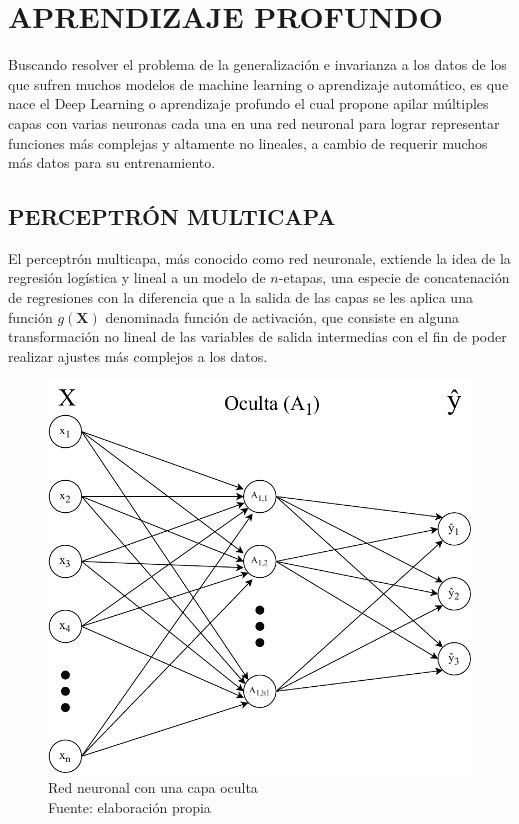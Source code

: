 \section{APRENDIZAJE PROFUNDO}
    Buscando resolver el problema de la generalización e invarianza a los datos de los que sufren muchos modelos de machine learning o aprendizaje automático, es que nace el Deep Learning o aprendizaje profundo el cual propone apilar múltiples capas con varias neuronas cada una en una red neuronal para lograr representar funciones más complejas y altamente no lineales, a cambio de requerir muchos más datos para su entrenamiento. \citep{Goodfellow-et-al-2016}
    \subsection{PERCEPTRÓN MULTICAPA}
        El perceptrón multicapa, más conocido como red neuronale, extiende la idea de la regresión logística y lineal a un modelo de $n$-etapas, una especie de concatenación de regresiones con la diferencia que a la salida de las capas se les aplica una función $g(\mathbf{X})$ denominada función de activación, que consiste en alguna transformación no lineal de las variables de salida intermedias con el fin de poder realizar ajustes más complejos a los datos. \citep{hastie01statisticallearning}
        
        \begin{figure}[h]
            \centering
            \includegraphics[scale=0.55]{imagenes/NeuralNetwork}
            \caption{Red neuronal con una capa oculta\\Fuente: elaboración propia}
        \end{figure}
        
